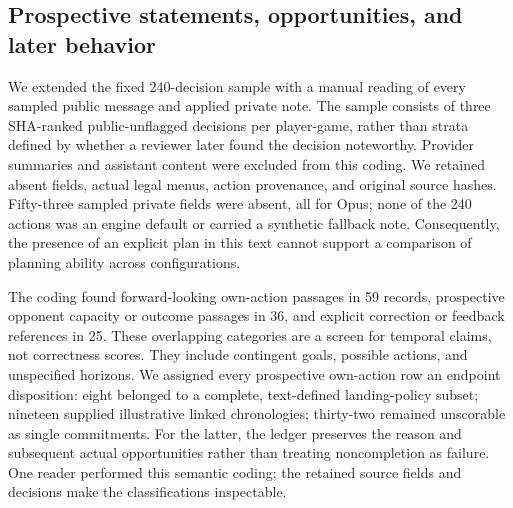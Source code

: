 \subsection{Prospective statements, opportunities, and later behavior}
\label{sec:temporal-audit}

We extended the fixed 240-decision sample with a manual reading of every sampled public message and applied private note. The sample consists of three SHA-ranked public-unflagged decisions per player-game, rather than strata defined by whether a reviewer later found the decision noteworthy. Provider summaries and assistant content were excluded from this coding. We retained absent fields, actual legal menus, action provenance, and original source hashes. Fifty-three sampled private fields were absent, all for Opus; none of the 240 actions was an engine default or carried a synthetic fallback note. Consequently, the presence of an explicit plan in this text cannot support a comparison of planning ability across configurations.

The coding found forward-looking own-action passages in 59 records, prospective opponent capacity or outcome passages in 36, and explicit correction or feedback references in 25. These overlapping categories are a screen for temporal claims, not correctness scores. They include contingent goals, possible actions, and unspecified horizons. We assigned every prospective own-action row an endpoint disposition: eight belonged to a complete, text-defined landing-policy subset; nineteen supplied illustrative linked chronologies; thirty-two remained unscorable as single commitments. For the latter, the ledger preserves the reason and subsequent actual opportunities rather than treating noncompletion as failure. One reader performed this semantic coding; the retained source fields and decisions make the classifications inspectable.

